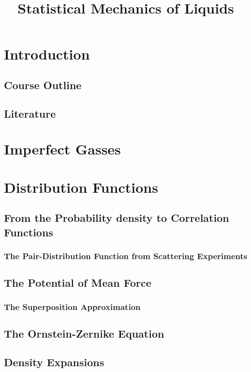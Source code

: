 \documentclass[a4paper,11pt]{article}
\title{Statistical Mechanics of Liquids}
\begin{document}
 

\maketitle
\flushbottom

\newpage
\section{Introduction}
\subsection{Course Outline}
\subsection{Literature}

\newpage

\section{Imperfect Gasses}\label{sec:imperfect}

\section{Distribution Functions}\label{sec:distribution}
\subsection{From the Probability density to Correlation Functions}

\subsubsection{The Pair-Distribution Function from Scattering Experiments}
\subsection{The Potential of Mean Force}
\subsubsection{The Superposition Approximation}
\subsection{The Ornstein-Zernike Equation}
\subsection{Density Expansions}

\end{document}
